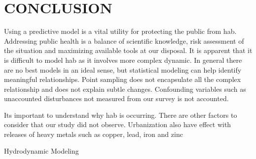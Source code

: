 \chapter{CONCLUSION}

Using a predictive model is a vital utility for protecting the public from \gls{hab}. Addressing public health is a balance of scientific knowledge, risk assessment of the situation and maximizing available tools at our disposal. It is apparent that it is difficult to model \gls{hab} as it involves more complex dynamic. In general there are no best models in an ideal sense, but statistical modeling can help identify meaningful relationships. Point sampling does not encapsulate all the complex relationship and does not explain subtle changes. Confounding variables such as unaccounted disturbances not measured from our survey is not accounted.

Its important to understand why \gls{hab} is occurring. There are other factors to consider that our study did not observe. Urbanization also have effect with releases of heavy metals such as copper, lead, iron and zinc \cite{clausen_introduction_2018}


Hydrodynamic Modeling
